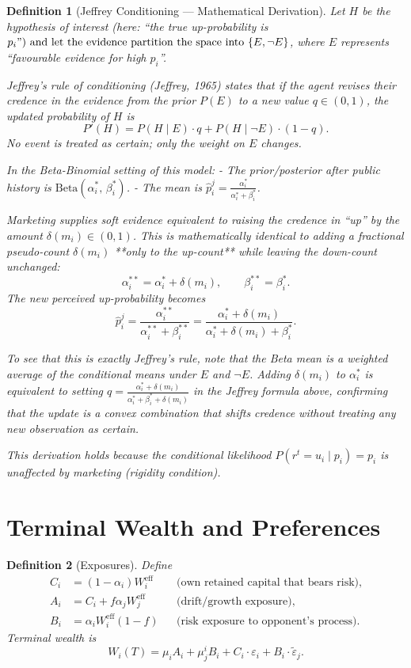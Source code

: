 \documentclass[12pt,a4paper]{article}
\newtheorem{definition}{Definition}[section]
\newcommand{\1}{\mathbf{1}}
\begin{document}
\begin{definition}[Jeffrey Conditioning — Mathematical Derivation]
Let \(H\) be the hypothesis of interest (here: ``the true up-probability is \(p_i$'') and let the evidence partition the space into \(\{E, \neg E\}\), where \(E\) represents ``favourable evidence for high \(p_i\)''.

Jeffrey's rule of conditioning (Jeffrey, 1965) states that if the agent revises their credence in the evidence from the prior \(P(E)\) to a new value \(q \in (0,1)\), the updated probability of \(H\) is
\[
P'(H) = P(H \mid E) \cdot q + P(H \mid \neg E) \cdot (1-q).
\]
No event is treated as certain; only the weight on \(E\) changes.

In the Beta-Binomial setting of this model:
- The prior/posterior after public history is \(\mathrm{Beta}(\alpha_i^*,\, \beta_i^*)\).
- The mean is \(\hat{p}_i^j = \frac{\alpha_i^*}{\alpha_i^* + \beta_i^*}\).

Marketing supplies soft evidence equivalent to raising the credence in ``up'' by the amount \(\delta(m_i) \in (0,1)\). This is mathematically identical to adding a fractional pseudo-count \(\delta(m_i)\) **only to the up-count** while leaving the down-count unchanged:
\[
\alpha_i^{**} = \alpha_i^* + \delta(m_i), \qquad \beta_i^{**} = \beta_i^*.
\]
The new perceived up-probability becomes
\[
\hat{p}_i^j = \frac{\alpha_i^{**}}{\alpha_i^{**} + \beta_i^{**}} = \frac{\alpha_i^* + \delta(m_i)}{\alpha_i^* + \delta(m_i) + \beta_i^*}.
\]

To see that this is exactly Jeffrey's rule, note that the Beta mean is a weighted average of the conditional means under \(E\) and \(\neg E\). Adding \(\delta(m_i)\) to \(\alpha_i^*\) is equivalent to setting \(q = \frac{\alpha_i^* + \delta(m_i)}{\alpha_i^* + \beta_i^* + \delta(m_i)}\) in the Jeffrey formula above, confirming that the update is a convex combination that shifts credence without treating any new observation as certain.

This derivation holds because the conditional likelihood \(P(r^t = u_i \mid p_i) = p_i\) is unaffected by marketing (rigidity condition).
\end{definition}

\section{Terminal Wealth and Preferences}

\begin{definition}[Exposures]
Define
\begin{align}
  C_i &= (1 - \alpha_i) W_i^{\mathrm{eff}} && \text{(own retained capital that bears risk)}, \\
  A_i &= C_i + f \alpha_j W_j^{\mathrm{eff}} && \text{(drift/growth exposure)}, \\
  B_i &= \alpha_i W_i^{\mathrm{eff}} (1-f) && \text{(risk exposure to opponent's process)}.
\end{align}
Terminal wealth is
\[
W_i(T) = \mu_i A_i + \mu_j^i B_i + C_i \cdot \varepsilon_i + B_i \cdot \tilde{\varepsilon}_j.
\]
\end{definition}
\end{document}
